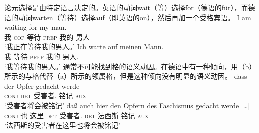 \begin{exe}
\begin{xlist}[iv.]
\begin{exe}
\begin{xlist}[iv.]
论元选择是由特定语言决定的。英语的动词wait（等）选择for（德语的für），而德语的动词warten（等待）选择auf（即英语的on），然后再加一个受格宾语。
\eal \label{loureed}
\ex 
\gll I am waiting for my man.\\
     我 \textsc{cop} 等待 \textsc{prep} 我的 男人\\
\glt `我正在等待我的男人。'
\ex 
\gll Ich warte auf meinen Mann.\\
     我   等待  \textsc{prep}  我的     男人.\acc\\
\glt `我等待我的男人。'
\zl
通常不可能找到格的语义动因。在德语中有一种倾向，用（b）所示的与格代替（a）所示的领属格，但是这种倾向没有明显的语义动因。
\eal
\ex 
\gll dass der Opfer gedacht werde\\
     \textsc{conj} \textsc{det} 受害者.\gen{} 铭记 \textsc{aux}\\
\glt `受害者将会被铭记'
\ex 
\gll daß auch hier den Opfern des Faschismus gedacht werde [\ldots]\footnotemark\\
     \textsc{conj} 也 这里 \textsc{det} 受害者.\dat{} \textsc{det} 法西斯 铭记 \textsc{aux}\\
\glt `法西斯的受害者在这里也将会被铭记'

\end{xlist}
\end{exe}
\end{xlist}
\end{exe}

